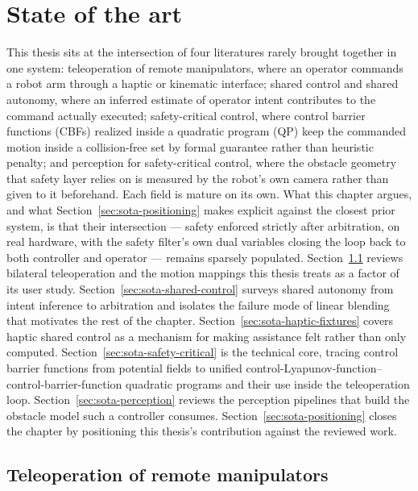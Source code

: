\chapter{State of the art}
\label{ch:sota}

This thesis sits at the intersection of four literatures rarely brought together in one system: teleoperation of remote manipulators, where an operator commands a robot arm through a haptic or kinematic interface; shared control and shared autonomy, where an inferred estimate of operator intent contributes to the command actually executed; safety-critical control, where control barrier functions (CBFs) realized inside a quadratic program (QP) keep the commanded motion inside a collision-free set by formal guarantee rather than heuristic penalty; and perception for safety-critical control, where the obstacle geometry that safety layer relies on is measured by the robot's own camera rather than given to it beforehand. Each field is mature on its own. What this chapter argues, and what Section~\ref{sec:sota-positioning} makes explicit against the closest prior system, is that their intersection --- safety enforced strictly after arbitration, on real hardware, with the safety filter's own dual variables closing the loop back to both controller and operator --- remains sparsely populated. Section~\ref{sec:sota-teleoperation} reviews bilateral teleoperation and the motion mappings this thesis treats as a factor of its user study. Section~\ref{sec:sota-shared-control} surveys shared autonomy from intent inference to arbitration and isolates the failure mode of linear blending that motivates the rest of the chapter. Section~\ref{sec:sota-haptic-fixtures} covers haptic shared control as a mechanism for making assistance felt rather than only computed. Section~\ref{sec:sota-safety-critical} is the technical core, tracing control barrier functions from potential fields to unified control-Lyapunov-function--control-barrier-function quadratic programs and their use inside the teleoperation loop. Section~\ref{sec:sota-perception} reviews the perception pipelines that build the obstacle model such a controller consumes. Section~\ref{sec:sota-positioning} closes the chapter by positioning this thesis's contribution against the reviewed work.

\section{Teleoperation of remote manipulators}
\label{sec:sota-teleoperation}

